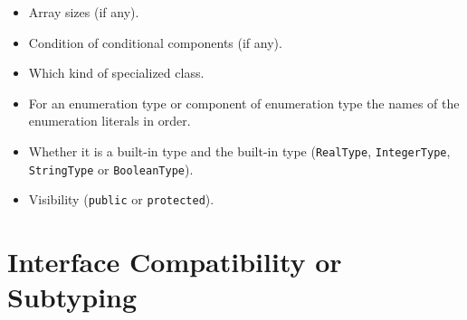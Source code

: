 \begin{itemize}
\begin{itemize}
  \item
    Array sizes (if any).
  \item
    Condition of conditional components (if any).
  \item
    Which kind of specialized class.
  \item
    For an enumeration type or component of enumeration type the names of the enumeration literals in order.
  \item
    Whether it is a built-in type and the built-in type (\lstinline!RealType!, \lstinline!IntegerType!, \lstinline!StringType! or \lstinline!BooleanType!).
  \item
    Visibility (\lstinline!public! or \lstinline!protected!).
  \end{itemize}
\end{itemize}

\section{Interface Compatibility or Subtyping}\label{interface-compatibility-or-subtyping}

